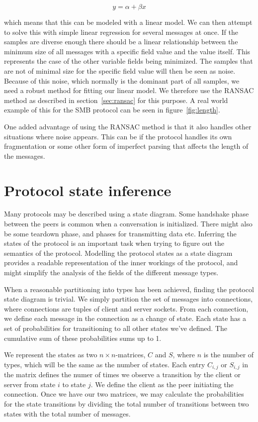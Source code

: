 \documentclass[a4paper]{report}
\begin{document}
\[
    y = \alpha + \beta x
    \label{eq:linlength}
\]

which means that this can be modeled with a linear model. We can then attempt
to solve this with simple linear regression for several messages at once. If
the samples are diverse enough there should be a linear relationship between
the minimum size of all messages with a specific field value and the value
itself. This represents the case of the other variable fields being minimized.
The samples that are not of minimal size for the specific field value will then
be seen as noise. Because of this noise, which normally is the dominant part of
all samples, we need a robust method for fitting our linear model. We therefore
use the RANSAC method as described in section~\ref{sec:ransac} for this
purpose. A real world example of this for the SMB protocol can be seen in
figure~\ref{fig:length}.

One added advantage of using the RANSAC method is that it also handles other
situations where noise appears. This can be if the protocol handles its own
fragmentation or some other form of imperfect parsing that affects the length
of the messages.

\section{Protocol state inference}
Many protocols may be described using a state diagram. Some handshake phase
between the peers is common when a conversation is initialized. There might
also be some teardown phase, and phases for transmitting data etc.
Inferring the states of the protocol is an important task when trying to
figure out the semantics of the protocol. Modelling the protocol states as
a state diagram provides a readable representation of the inner workings
of the protocol, and might simplify the analysis of the fields of the
different message types.

When a reasonable partitioning into types has been achieved, finding the
protocol state diagram is trivial. We simply partition the set of messages
into connections, where connections are tuples of client and server sockets.
From each connection, we define each message in the connection as a change
of state. Each state has a set of probabilities for transitioning to
all other states we've defined. The cumulative sum of these probabilities 
sums up to 1. 

We represent the states as two $n \times n$-matrices, $C$ and  $S$, where 
$n$ is the number of types, which will be the same as the number of states.
Each entry $C_{i,j}$ or $S_{i,j}$ in the matrix defines the numer of times
we observe a transition by the client or server from state $i$ to state $j$.
We define the client as the peer initiating the connection. Once we have our
two matrices, we may calculate the probabilities for the state transitions by
dividing the total number of transitions between two states with the total
number of messages.
\end{document}
